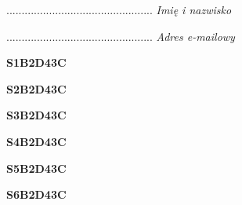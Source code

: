 \begin{turn}{90}\begin{minipage}{\linewidth} \vspace{20mm} ................................................  \textit{Imię i nazwisko}\end{minipage}\end{turn}

\begin{turn}{90}\begin{minipage}{\linewidth} \vspace{20mm} ................................................  \textit{Adres e-mailowy}\end{minipage}\end{turn}

\begin{turn}{90}\huge \begin{minipage}{\linewidth} \vspace{10mm}\textbf{S1B2D43C}\end{minipage}\end{turn}

\begin{turn}{90}\huge \begin{minipage}{\linewidth} \vspace{10mm}\textbf{S2B2D43C}\end{minipage}\end{turn}

\begin{turn}{90}\huge \begin{minipage}{\linewidth} \vspace{10mm}\textbf{S3B2D43C}\end{minipage}\end{turn}

\begin{turn}{90}\huge \begin{minipage}{\linewidth} \vspace{10mm}\textbf{S4B2D43C}\end{minipage}\end{turn}

\begin{turn}{90}\huge \begin{minipage}{\linewidth} \vspace{10mm}\textbf{S5B2D43C}\end{minipage}\end{turn}

\begin{turn}{90}\huge \begin{minipage}{\linewidth} \vspace{10mm}\textbf{S6B2D43C}\end{minipage}\end{turn}

